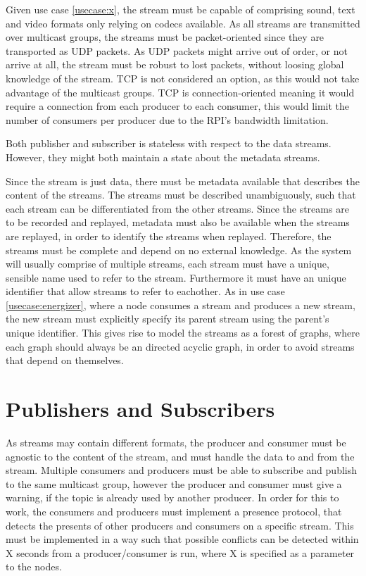 Given use case \ref{usecase:x}, the stream must be capable of comprising sound, text and video formats only relying on codecs available. As all streams are transmitted over multicast groups, the streams must be packet-oriented since they are transported as UDP packets.
As UDP packets might arrive out of order, or not arrive at all, the stream must be robust to lost packets, without loosing global knowledge of the stream.
TCP is not considered an option, as this would not take advantage of the multicast groups. TCP is connection-oriented meaning it would require a connection from each producer to each consumer, this would limit the number of consumers per producer due to the RPI's bandwidth limitation.

Both publisher and subscriber is stateless with respect to the data streams. However, they might both maintain a state about the metadata streams.

Since the stream is just data, there must be metadata available that describes the content of the streams. The streams must be described unambiguously, such that each stream can be differentiated from the other streams. Since the streams are to be recorded and replayed, metadata must also be available when the streams are replayed, in order to identify the streams when replayed. Therefore, the streams must be complete and depend on no external knowledge.
As the system will usually comprise of multiple streams, each stream must have a unique, sensible name used to refer to the stream. Furthermore it must have an unique identifier that allow streams to refer to eachother.
As in use case \ref{usecase:energizer}, where a node consumes a stream and produces a new stream, the new stream must explicitly specify its parent stream using the parent's unique identifier. This gives rise to model the streams as a forest of graphs, where each graph should always be an directed acyclic graph, in order to avoid streams that depend on themselves.


\section{Publishers and Subscribers}
As streams may contain different formats, the producer and consumer must be agnostic to the content of the stream, and must handle the data to and from the stream.
Multiple consumers and producers must be able to subscribe and publish to the same multicast group, however the producer and consumer must give a warning, if the topic is already used by another producer. In order for this to work, the consumers and producers must implement a presence protocol, that detects the presents of other producers and consumers on a specific stream. This must be implemented in a way such that possible conflicts can be detected within X seconds from a producer/consumer is run, where X is specified as a parameter to the nodes.

